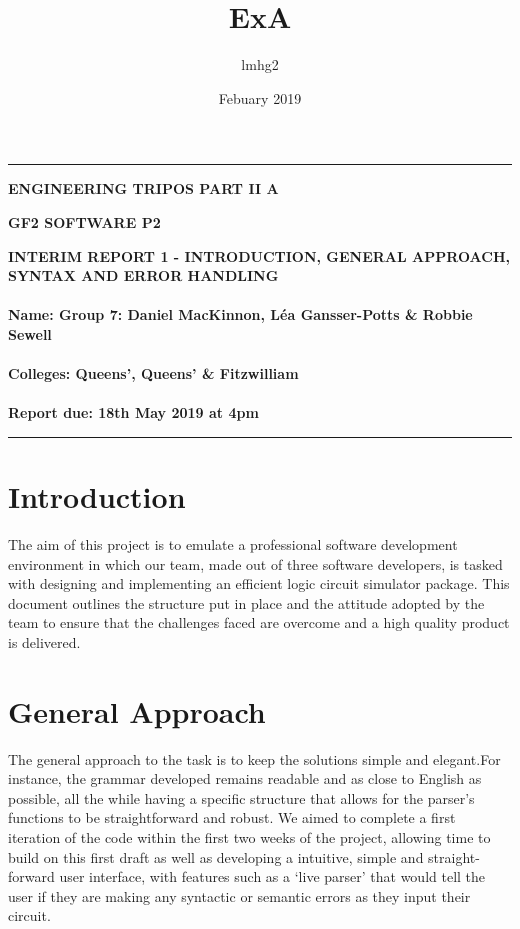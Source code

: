 \documentclass[12pt]{article}
\title{ExA}
\author{lmhg2 }
\date{Febuary 2019}
\begin{document}
\def\n{\noindent}
\def\u{\underline}
\def\hs{\hspace}
\newcommand{\thrfor}{.^{\displaystyle .} .}
\newcommand{\bvec}[1]{{\bf #1}}

\noindent
\rule{390pt}{0.5mm}

\begin{center}
{\bf ENGINEERING TRIPOS PART II A}
\end{center}
\vspace{0.5cm} {\bf GF2 \hfill SOFTWARE P2}
\vspace{0.5cm}
\begin{center}
{\bf INTERIM REPORT 1 - INTRODUCTION, GENERAL APPROACH, SYNTAX AND ERROR HANDLING \\
\hfill
\\Name: Group 7: Daniel MacKinnon, L\'ea Gansser-Potts \& Robbie Sewell\\\hfill\\
Colleges: Queens', Queens' \& Fitzwilliam\\\hfill\\
Report due: 18th May 2019 at 4pm
}
\end{center}
\rule{390pt}{0.5mm}

\newpage
\section{Introduction}
The aim of this project is to emulate a professional software development environment in which our team, made out of three software developers,  is tasked with designing and implementing an efficient logic circuit simulator package. This document outlines the structure put in place and the attitude adopted by the team to ensure that the challenges faced are overcome and a high quality product is delivered.  

\section{General Approach}
The general approach to the task is to keep the solutions simple and elegant.For instance, the grammar developed remains readable and as close to English as possible, all the while having a specific structure that allows for the parser's functions to be straightforward and robust. We aimed to complete a first iteration of the code within the first two weeks of the project, allowing time to build on this first draft as well as developing a intuitive, simple and straight-forward user interface, with features such as a `live parser' that would tell the user if they are making any syntactic or semantic errors as they input their circuit.\\
\end{document}
